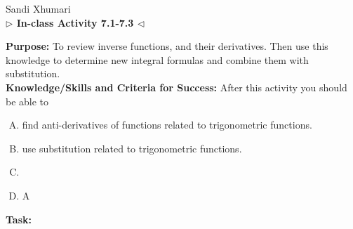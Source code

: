 \documentclass[answers]{exam}
\begin{document}
	\begin{center}
	\hfill Sandi Xhumari \\ \textbf{$\triangleright$ In-class Activity 7.1-7.3 $\triangleleft$}\\
\end{center}

\textbf{Purpose:} To review inverse functions, and their derivatives. Then use this knowledge to determine new integral formulas and combine them with substitution.  \\

\textbf{Knowledge/Skills and Criteria for Success:} After this activity you should be able to

\begin{enumerate}[A.]
	\item find anti-derivatives of functions related to trigonometric functions. 
	\item use substitution related to trigonometric functions.
	\item 
	\item A
	
\end{enumerate}

\textbf{Task:}
\end{document}
